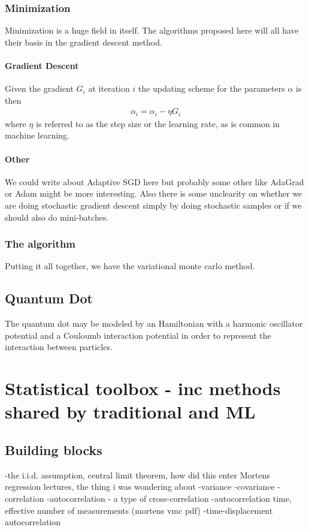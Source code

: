 \documentclass[twoside,english]{uiofysmaster}
\begin{document}
\subsection{Minimization}
Minimization is a huge field in itself. The algorithms proposed here will all have their basis in the gradient descent method. 

\subsubsection{Gradient Descent}
Given the gradient $G_i$ at iteration $i$ the updating scheme for the parameters $\alpha$ is then
\begin{align}
	\alpha_i = \alpha_i - \eta G_i
\end{align}
where $\eta$ is referred to as the step size or the learning rate, as is common in machine learning.

\subsubsection{Other}
We could write about Adaptive SGD here but probably some other like AdaGrad or Adam might be more interesting. Also there is some unclearity on whether we are doing stochastic gradient descent simply by doing stochastic samples or if we should also do mini-batches.

\subsection{The algorithm}
Putting it all together, we have the variational monte carlo method. 

\section{Quantum Dot}
The quantum dot may be modeled by an Hamiltonian with a harmonic oscillator potential and a Couloumb interaction potential in order to represent the interaction between particles.


\chapter{Statistical toolbox - inc methods shared by traditional and ML}
\section{Building blocks}
-the i.i.d. assumption, central limit theorem, how did this enter Mortens regression lectures, the thing i was wondering about
-variance
-covariance
-correlation
-autocorrelation - a type of cross-correlation
-autocorrelation time, effective number of measurements (mortens vmc pdf)
-time-displacement autocorrelation
\end{document}
